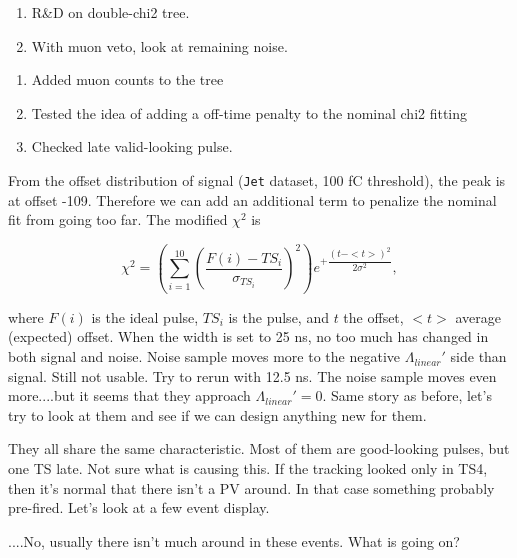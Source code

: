 

\begin{enumerate}
\item R\&D on double-chi2 tree.
\item With muon veto, look at remaining noise.
\end{enumerate}


\begin{enumerate}
\item Added muon counts to the tree
\item Tested the idea of adding a off-time penalty to the nominal chi2 fitting
\item Checked late valid-looking pulse.
\end{enumerate}



From the offset distribution of signal (\texttt{Jet} dataset, 100 fC threshold), the peak is at offset -109.
Therefore we can add an additional term to penalize the nominal fit from going too far.  The modified $\chi^2$ is

\begin{equation}
\chi^2 = \left(\sum_{i=1}^{10} \left(\dfrac{F(i) - TS_i}{\sigma_{TS_i}}\right)^2 \right)
   e^{+\dfrac{(t-<t>)^2}{2 \sigma^2}},
\nonumber
\end{equation}

where $F(i)$ is the ideal pulse, $TS_i$ is the pulse, and $t$ the offset, $<t>$ average (expected) offset.
When the width is set to 25 ns, no too much has changed in both signal and noise.  Noise sample
moves more to the negative $\Lambda_{linear}'$ side than signal.
Still not usable.
Try to rerun with 12.5 ns.  The noise sample moves even more....but it seems that they approach $\Lambda_{linear}' = 0$.
Same story as before, let's try to look at them and see if we can design anything new for them.


They all share the same characteristic.  Most of them are good-looking pulses, but one TS late.
Not sure what is causing this.  If the tracking looked only in TS4, then it's normal that there isn't a PV around.
In that case something probably pre-fired.  Let's look at a few event display.

....No, usually there isn't much around in these events.  What is going on?



